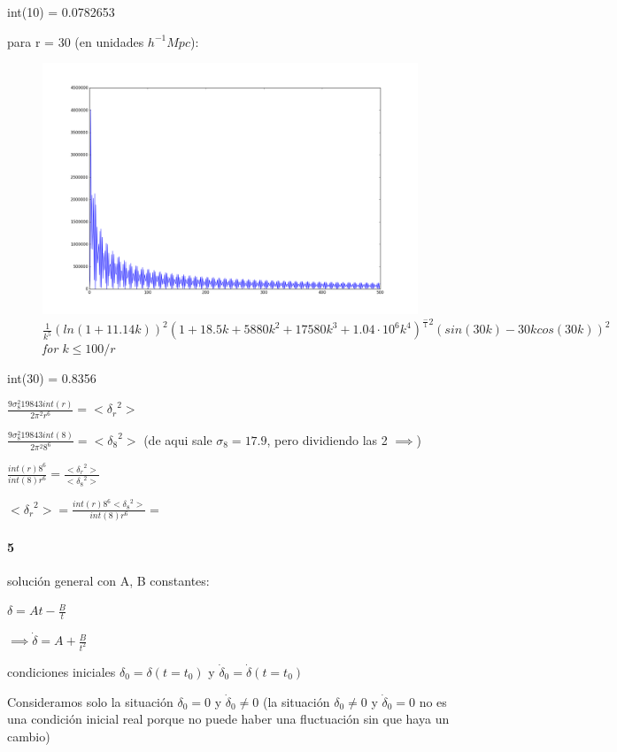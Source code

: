\documentclass[12pt]{book}
\begin{document}
int(10) = 0.0782653

para r = 30 (en unidades $h^{-1}Mpc$):

\begin{figure}[H]
 \centering
 \includegraphics[scale=0.5]{graf3.png}
 \caption{\emph{$ \frac{1}{k^5}(ln(1+11.14k))^2 
(1+18.5k + 5880k^2+17580k^3 + 1.04 \cdot 10^6 k^4)^{\frac-{1}{2}}(sin(30 k) - 30 k  cos(30k))^2$ for $k\le 100/r$}}
\end{figure}
int(30) = 0.8356


$\frac{9 \sigma_8^2 19843 int(r)}{2\pi^2 r^6} = <{\delta_r}^2> $

$\frac{9 \sigma_8^2 19843 int(8)}{2\pi^2 8^6} = <{\delta_8}^2> $ (de aqui sale $\sigma_8=17.9$, pero dividiendo las 2 $\implies$)

$ \frac{int(r) 8^6}{int(8) r^6} = \frac{<{\delta_r}^2> }{<{\delta_8}^2> }$ 

$ <{\delta_r}^2> =  \frac{int(r) 8^6 <{\delta_8}^2> }{int(8) r^6} = $ 
\paragraph{5}

solución general con A, B constantes:

$\delta = A t - \frac{B}{t}$

$\implies \dot \delta = A + \frac{B}{t^2}$

condiciones iniciales $\delta_0=\delta(t=t_0) $ y $\dot\delta_0 = \dot\delta(t=t_0)$

Consideramos solo la situación $\delta_0 = 0$ y $\dot\delta_0 \neq 0$ (la situación $\delta_0 \neq 0$ y $\dot\delta_0 = 0$ 
no es una condición inicial real porque no puede haber una fluctuación sin que haya un cambio)
\end{document}
